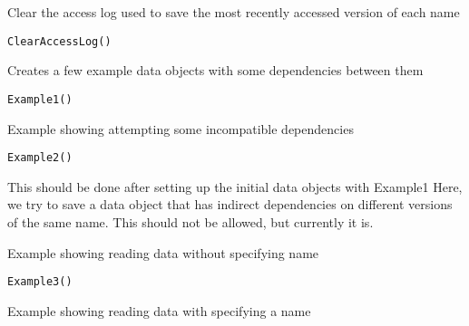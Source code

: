 \documentclass[a4paper]{book}
\begin{document}
%
\begin{Description}\relax
Clear the access log used to save the most recently accessed version of each name
\end{Description}
%
\begin{Usage}
\begin{verbatim}
ClearAccessLog()
\end{verbatim}
\end{Usage}
%
\begin{Description}\relax
Creates a few example data objects with some dependencies between them
\end{Description}
%
\begin{Usage}
\begin{verbatim}
Example1()
\end{verbatim}
\end{Usage}
%
\begin{Description}\relax
Example showing attempting some incompatible dependencies
\end{Description}
%
\begin{Usage}
\begin{verbatim}
Example2()
\end{verbatim}
\end{Usage}
%
\begin{Details}\relax
This should be done after setting up the initial data objects with Example1
Here, we try to save a data object that has indirect dependencies on different versions of the same
name. This should not be allowed, but currently it is.
\end{Details}
%
\begin{Description}\relax
Example showing reading data without specifying name
\end{Description}
%
\begin{Usage}
\begin{verbatim}
Example3()
\end{verbatim}
\end{Usage}
%
\begin{Description}\relax
Example showing reading data with specifying a name
\end{Description}
\end{document}
